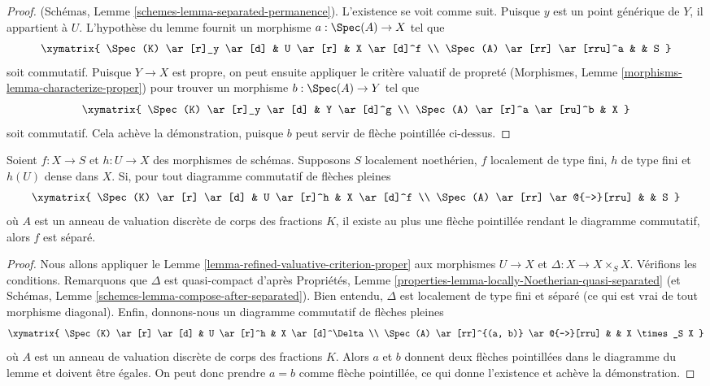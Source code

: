 \begin{proof}
(Schémas, Lemme \ref{schemes-lemma-separated-permanence}).
L'existence se voit comme suit.
Puisque $y$ est un point générique de $Y$, il appartient à $U$.
L'hypothèse du lemme
fournit un morphisme $a : \Spec(A) \to X$ tel que
$$
\xymatrix{
\Spec(K) \ar[r]_y \ar[d] & U \ar[r] & X \ar[d]^f \\
\Spec(A) \ar[rr] \ar[rru]^a & & S
}
$$
soit commutatif. Puisque $Y \to X$ est propre, on peut ensuite
appliquer le critère valuatif de propreté
(Morphismes, Lemme \ref{morphisms-lemma-characterize-proper})
pour trouver un morphisme $b : \Spec(A) \to Y$ tel que
$$
\xymatrix{
\Spec(K) \ar[r]_y \ar[d] & Y \ar[d]^g \\
\Spec(A) \ar[r]^a \ar[ru]^b & X
}
$$
soit commutatif. Cela achève la démonstration, puisque
$b$ peut servir de flèche pointillée ci-dessus.
\end{proof}

\begin{lemma}
\label{lemma-refined-valuative-criterion-separated}
Soient $f : X \to S$ et $h : U \to X$ des morphismes de schémas.
Supposons $S$ localement noethérien, $f$ localement de type fini,
$h$ de type fini et $h(U)$ dense dans $X$.
Si, pour tout diagramme commutatif de flèches pleines
$$
\xymatrix{
\Spec(K) \ar[r] \ar[d] & U \ar[r]^h & X \ar[d]^f \\
\Spec(A) \ar[rr] \ar@{-->}[rru] & & S
}
$$
où $A$ est un anneau de valuation discrète de corps des fractions $K$,
il existe au plus une flèche pointillée rendant le diagramme commutatif, alors $f$ est
séparé.
\end{lemma}

\begin{proof}
Nous allons appliquer le Lemme \ref{lemma-refined-valuative-criterion-proper}
aux morphismes $U \to X$ et $\Delta : X \to X \times_S X$.
Vérifions les conditions. Remarquons que $\Delta$ est quasi-compact d'après
Propriétés, Lemme \ref{properties-lemma-locally-Noetherian-quasi-separated}
(et Schémas, Lemme \ref{schemes-lemma-compose-after-separated}).
Bien entendu, $\Delta$ est localement de type fini et séparé (ce qui est vrai
de tout morphisme diagonal).
Enfin, donnons-nous un diagramme commutatif de flèches pleines
$$
\xymatrix{
\Spec(K) \ar[r] \ar[d] & U \ar[r]^h & X \ar[d]^\Delta \\
\Spec(A) \ar[rr]^{(a, b)} \ar@{-->}[rru] & & X \times_S X
}
$$
où $A$ est un anneau de valuation discrète de corps des fractions $K$.
Alors $a$ et $b$ donnent deux flèches pointillées dans le diagramme du lemme
et doivent être égales. On peut donc prendre $a = b$ comme flèche pointillée,
ce qui donne l'existence et achève la démonstration.
\end{proof}

